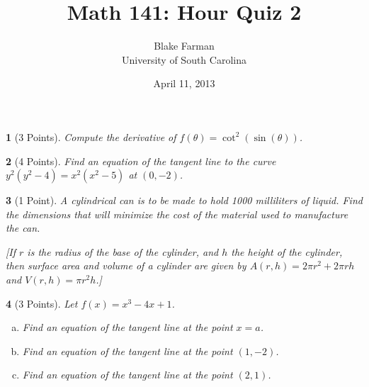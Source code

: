 \documentclass[10pt]{amsart}
\author{Blake Farman\\University of South Carolina}
\title{Math 141: Hour Quiz 2}
\date{April 11, 2013}
\begin{document}
\maketitle

\begin{center}
\end{center}

\vspace{0.2in}
\vspace{0.2in}

\theoremstyle{plain}
\newtheorem{thm}{}
\newtheorem{lem}{Lemma}
\theoremstyle{definition}
\newtheorem{defn}{Definition}

\begin{thm}[3 Points]
  Compute the derivative of $f(\theta) = \cot^2(\sin(\theta))$.
  \vspace{.5in}
\end{thm}

\begin{thm}[4 Points]
  Find an equation of the tangent line to the curve $y^2(y^2 - 4) = x^2(x^2 - 5)$ at $(0, -2)$.
\end{thm}
\pagebreak
\begin{thm}[1 Point]
  A cylindrical can is to be made to hold 1000 milliliters of liquid.
  Find the dimensions that will minimize the cost of the material used to manufacture the can.
  
  [If $r$ is the radius of the base of the cylinder, and $h$ the height of the cylinder, then surface area and volume of a cylinder are given by $A(r, h) = 2\pi r^2 + 2\pi r h$ and $V(r,h) = \pi r^2 h$.]
  \vspace{.5in}
\end{thm}

\begin{thm}[3 Points]
  Let $f(x) = x^3 - 4x + 1$.
  \begin{enumerate}[(a)]
  \item
    Find an equation of the tangent line at the point $x = a$.
    \vspace{1in}
  \item
    Find an equation of the tangent line at the point $(1, -2)$.
    \vspace{1in}
  \item
    Find an equation of the tangent line at the point $(2,1)$.
    \vspace{1in}
  \end{enumerate}
\end{thm}
\end{document}
